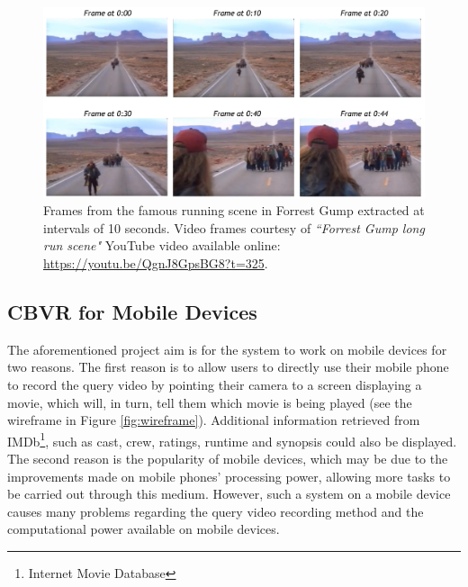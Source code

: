 \begin{figure}[h]
\centerline{\includegraphics[width=\textwidth]{figures/litsurvey/forrest_gump_shot.jpg}}
\caption{\label{fig:forrest_gump_frames}Frames from the famous running scene in Forrest Gump extracted at intervals of 10 seconds. Video frames courtesy of \textit{``Forrest Gump long run scene"} YouTube video available online: \url{https://youtu.be/QgnJ8GpsBG8?t=325}.}
\end{figure}

\subsection{CBVR for Mobile Devices}

The aforementioned project aim is for the system to work on mobile devices for two reasons. The first reason is to allow users to directly use their mobile phone to record the query video by pointing their camera to a screen displaying a movie, which will, in turn, tell them which movie is being played (see the wireframe in Figure \ref{fig:wireframe}). Additional information retrieved from IMDb\footnote{Internet Movie Database}, such as cast, crew, ratings, runtime and synopsis could also be displayed. The second reason is the popularity of mobile devices, which may be due to the improvements made on mobile phones' processing power, allowing more tasks to be carried out through this medium. However, such a system on a mobile device causes many problems regarding the query video recording method and the computational power available on mobile devices.\\

